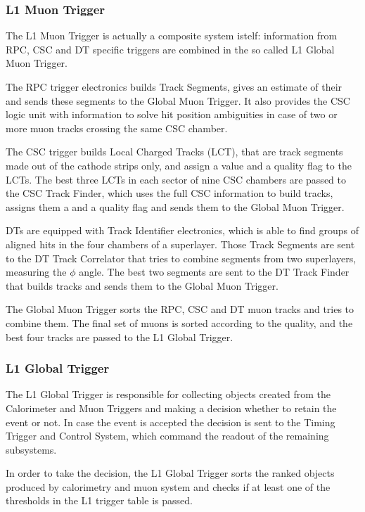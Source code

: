 \subsubsection{L1 Muon Trigger}

The L1 Muon Trigger is actually a composite system istelf: information from RPC, CSC and DT specific triggers are combined in the so called L1 Global Muon Trigger. 

The RPC trigger electronics builds Track Segments, gives an estimate of their \pt and sends these segments to the Global Muon Trigger. It also provides the CSC logic unit with information to solve hit position ambiguities in case of two or more muon tracks crossing the same CSC chamber. 

The CSC trigger builds Local Charged Tracks (LCT), that are track segments made out of the cathode strips only, and assign a \pt value and a quality flag to the LCTs. The best three LCTs in each sector of nine CSC chambers are passed to the CSC Track Finder, which uses the full CSC information to build tracks, assigns them a \pt and a quality flag and sends them to the Global Muon Trigger.

DTs are equipped with Track Identifier electronics, which is able to find groups of aligned hits in the four chambers of a superlayer. Those Track Segments are sent to the DT Track Correlator that tries to combine segments from two superlayers, measuring the $\phi$ angle. The best two segments are sent to the DT Track Finder that builds tracks and sends them to the Global Muon Trigger.

The Global Muon Trigger sorts the RPC, CSC and DT muon tracks and tries to combine them. The final set of muons is sorted according to the quality, and the best four tracks are passed to the L1 Global Trigger.

\subsubsection{L1 Global Trigger}

The L1 Global Trigger is responsible for collecting objects created from the Calorimeter and Muon Triggers and making a decision whether to retain the event or not. In case the event is accepted the decision is sent to the Timing Trigger and Control System, which command the readout of the remaining subsystems.

In order to take the decision, the L1 Global Trigger sorts the ranked objects produced by calorimetry and muon system and checks if at least one of the thresholds in the L1 trigger table is passed.

